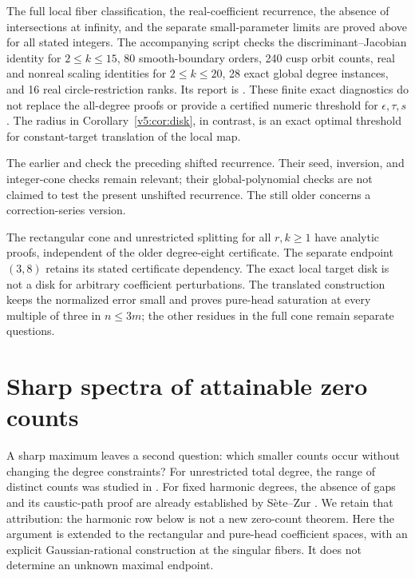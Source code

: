 \documentclass[UTF8,11pt]{ctexart}
\theoremstyle{definition}
\numberwithin{equation}{section}
\begin{document}
The full local fiber classification, the real-coefficient recurrence,
the absence of intersections at infinity, and the separate small-parameter
limits are proved above for all stated integers. The accompanying script
 checks the discriminant--Jacobian
identity for $2\le k\le15$, 80 smooth-boundary orders, 240 cusp
orbit counts, real and nonreal scaling identities for $2\le k\le20$,
28 exact global degree instances, and 16 real circle-restriction ranks.
Its report is .
These finite exact diagnostics do not replace the all-degree proofs
or provide a certified numeric threshold for $\epsilon,\tau,s$.
The radius in Corollary~\ref{v5:cor:disk}, in contrast, is an exact
optimal threshold for constant-target translation of the local map.

\begingroup\raggedright
The earlier  and
 check the preceding
shifted recurrence. Their seed, inversion, and integer-cone checks
remain relevant; their global-polynomial checks are not claimed to
test the present unshifted recurrence. The still older
 concerns a correction-series version.
\par\endgroup

The rectangular cone and unrestricted splitting for all $r,k\ge1$
have analytic proofs, independent of the older degree-eight certificate.
The separate endpoint $(3,8)$ retains its stated certificate dependency.
The exact local target disk is not a disk for arbitrary coefficient
perturbations. The translated construction keeps the normalized error
small and proves pure-head saturation at every multiple of three in
$n\le3m$; the other residues in the full cone remain separate questions.


\section{Sharp spectra of attainable zero counts}\label{v6:sec:spectra}

A sharp maximum leaves a second question: which smaller counts occur
without changing the degree constraints? For unrestricted total degree,
the range of distinct counts was studied in \cite[Theorem~2.16]{SZ24}.
For fixed harmonic degrees, the absence of gaps and its caustic-path
proof are already established by S\`ete--Zur
\cite[Theorem~5.4 and Remark~5.5, \av, pp.~24--25]{SZ21}.
We retain that attribution: the harmonic row below is not a new
zero-count theorem. Here the argument is extended to the rectangular
and pure-head coefficient spaces, with an explicit Gaussian-rational
construction at the singular fibers. It does not determine an unknown
maximal endpoint.
\end{document}
